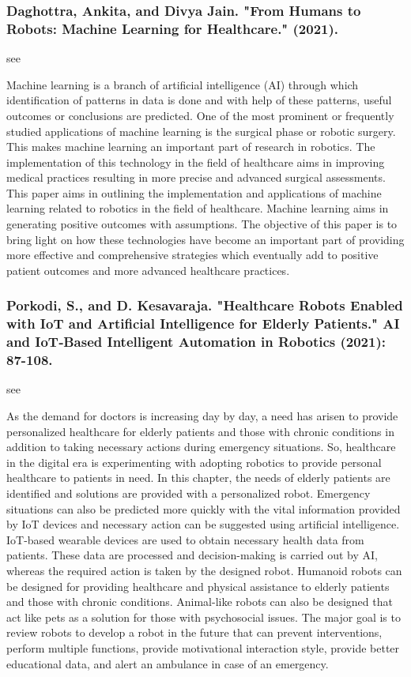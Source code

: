 \documentclass[conference]{IEEEtran}
\begin{document}
\medskip
\subsubsection{Daghottra, Ankita, and Divya Jain. "From Humans to Robots: Machine Learning for Healthcare." (2021).}
see \cite{daghottra2021humans}

Machine learning is a branch of artificial intelligence (AI) through which identification of patterns in data is done and with help of these patterns, useful outcomes or conclusions are predicted. One of the most prominent or frequently studied applications of machine learning is the surgical phase or robotic surgery. This makes machine learning an important part of research in robotics. The implementation of this technology in the field of healthcare aims in improving medical practices resulting in more precise and advanced surgical assessments. This paper aims in outlining the implementation and applications of machine learning related to robotics in the field of healthcare. Machine learning aims in generating positive outcomes with assumptions. The objective of this paper is to bring light on how these technologies have become an important part of providing more effective and comprehensive strategies which eventually add to positive patient outcomes and more advanced healthcare practices.

\medskip
\subsubsection{Porkodi, S., and D. Kesavaraja. "Healthcare Robots Enabled with IoT and Artificial Intelligence for Elderly Patients." AI and IoT‐Based Intelligent Automation in Robotics (2021): 87-108.}
see \cite{porkodi2021healthcare}

As the demand for doctors is increasing day by day, a need has arisen to provide personalized healthcare for elderly patients and those with chronic conditions in addition to taking necessary actions during emergency situations. So, healthcare in the digital era is experimenting with adopting robotics to provide personal healthcare to patients in need. In this chapter, the needs of elderly patients are identified and solutions are provided with a personalized robot. Emergency situations can also be predicted more quickly with the vital information provided by IoT devices and necessary action can be suggested using artificial intelligence. IoT-based wearable devices are used to obtain necessary health data from patients. These data are processed and decision-making is carried out by AI, whereas the required action is taken by the designed robot. Humanoid robots can be designed for providing healthcare and physical assistance to elderly patients and those with chronic conditions. Animal-like robots can also be designed that act like pets as a solution for those with psychosocial issues. The major goal is to review robots to develop a robot in the future that can prevent interventions, perform multiple functions, provide motivational interaction style, provide better educational data, and alert an ambulance in case of an emergency.
\end{document}
